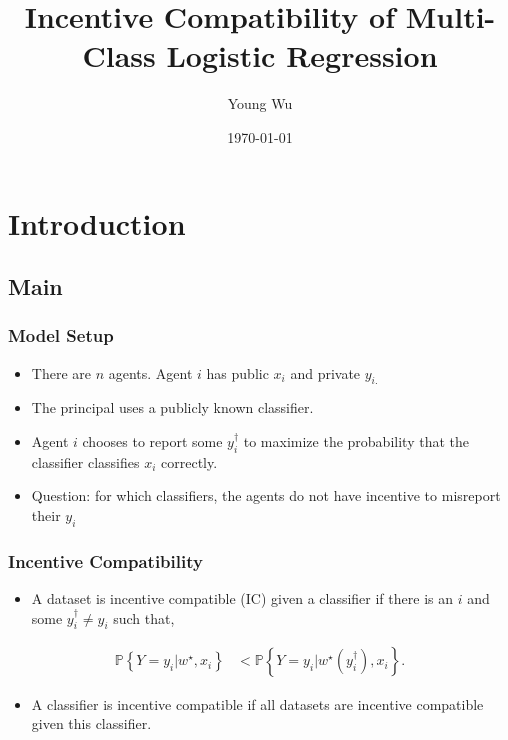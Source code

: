 \documentclass{beamer}
\title{Incentive Compatibility of Multi-Class Logistic Regression}
\author{Young Wu}
\date{\today}
\begin{document}
\newtheorem{thm}{Theorem}
\newtheorem{cor}{Corollary}
\newtheorem{lem}{Lemma}
\newtheorem{prop}{Proposition}
\newtheorem{conj}{Conjecture}
\newtheorem{algo}{Algorithm}
\newtheorem{obs}{Observation}
\newtheorem{clm}{Claim}
\theoremstyle{definition}
\newtheorem{df}{Definition}
\newtheorem{eg}{Example}
\newtheorem{asm}{Assumption}
\newtheorem{cond}{Condition}
\theoremstyle{remark}
\newtheorem{rmk}{Remark}
\begin{frame} \titlepage \end{frame}


\section{Introduction} \subsection{Main}

\begin{frame} \frametitle{Model Setup}
\begin{itemize}
\item There are $n $ agents. Agent $i $ has public $x_{i}$ and private $y_{i.}$
\item The principal uses a publicly known classifier.
\item Agent $i $ chooses to report some $y^{\dagger}_{i}$ to maximize the probability that the classifier classifies $x_{i}$ correctly.
\item Question: for which classifiers, the agents do not have incentive to misreport their $y_{i}$
\end{itemize}
\end{frame}

\begin{frame} \frametitle{Incentive Compatibility}
\begin{itemize}
\item A dataset is incentive compatible (IC) given a classifier if there is an $i $ and some $y^{\dagger}_{i} \neq  y_{i}$ such that,
\end{itemize}\begin{align*}
\mathbb{P}\left\{Y = y_{i} | w^\star , x_{i}\right\} &< \mathbb{P}\left\{Y = y_{i} | w^\star \left(y^{\dagger}_{i}\right), x_{i}\right\}.
\end{align*}
\begin{itemize}
\item A classifier is incentive compatible if all datasets are incentive compatible given this classifier.
\end{itemize}
\end{frame}
\end{document}
